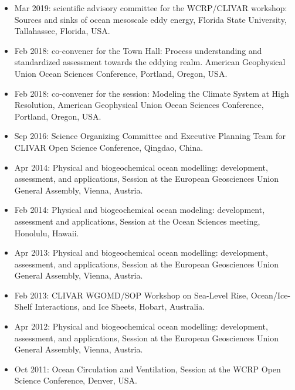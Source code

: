 \documentclass{article}
\begin{document}
\begin{itemize}[leftmargin=*]

\item Mar 2019: scientific advisory committee for the WCRP/CLIVAR workshop: Sources and sinks of ocean mesoscale eddy energy, Florida State University, Tallahassee, Florida, USA. 

\item Feb 2018: co-convener for the Town Hall: Process understanding and standardized assessment towards the eddying realm. {\sc American Geophysical Union Ocean Sciences Conference}, Portland, Oregon, USA.

\item Feb 2018: co-convener for the session: Modeling the Climate System at High Resolution, {\sc American Geophysical Union Ocean Sciences Conference}, Portland, Oregon, USA.

\item Sep 2016: Science Organizing Committee and Executive Planning
  Team for {\sc CLIVAR Open Science Conference}, Qingdao, China.

\item Apr 2014: {\sc Physical and biogeochemical ocean modelling: development, assessment, and applications}, Session at the European Geosciences Union General Assembly, Vienna, Austria.

\item Feb 2014: {\sc Physical and biogeochemical ocean modeling:
    development, assessment and applications}, Session at the Ocean
  Sciences meeting, Honolulu, Hawaii.

\item Apr 2013: {\sc Physical and biogeochemical ocean modelling:
  development, assessment, and applications}, Session at the European
Geosciences Union General Assembly, Vienna, Austria.

\item Feb 2013: {\sc CLIVAR WGOMD/SOP Workshop on Sea-Level Rise,
  Ocean/Ice-Shelf Interactions, and Ice Sheets}, Hobart, Australia.  

\item Apr 2012: {\sc Physical and biogeochemical ocean modelling:
  development, assessment, and applications}, Session at the European
Geosciences Union General Assembly, Vienna, Austria.

\item Oct 2011: {\sc Ocean Circulation and Ventilation}, Session at
the WCRP Open Science Conference, Denver, USA. 


\end{itemize}
\end{document}
